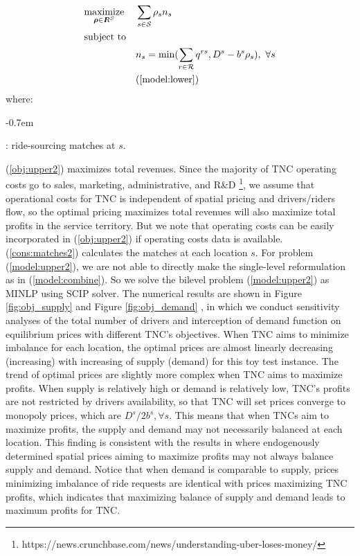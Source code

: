 \documentclass[review]{elsarticle}
\begin{document}
\begin{subequations}
\begin{align}
& \underset{\boldsymbol{\rho} \in {I\kern-.35em R}^{S}}{\text{maximize}}
& &\sum_{s \in \mathcal{S}} \rho_s n_s \label{obj:upper2}\\
& \text{subject to}  & & \nonumber \\
& && n_s = \min(\sum_{r \in \mathcal{R}} q^{rs}, {D}^s - b^s\rho_s), \ \forall s \label{cons:matches2}\\
& && (\ref{model:lower})
\end{align}
\label{model:upper2}
\end{subequations}
where: 
\begin{description}[leftmargin=!,labelwidth=\widthof{12345}]
\itemsep-0.7em
\item[$n_{s}$] : ride-sourcing matches at $s$.
\end{description}

(\ref{obj:upper2}) maximizes total revenues. Since the majority of TNC operating costs go to sales, marketing, administrative, and R\&D \footnote{https://news.crunchbase.com/news/understanding-uber-loses-money/}, we assume that operational costs for TNC is independent of spatial pricing and drivers/riders flow, so the optimal pricing maximizes total revenues will also maximize total profits in the service territory. But we note that operating costs can be easily incorporated in (\ref{obj:upper2}) if operating costs data is available. (\ref{cons:matches2}) calculates the matches at each location $s$. For problem (\ref{model:upper2}), we are not able to directly make the single-level reformulation as in (\ref{model:combine}). So we solve the bilevel problem (\ref{model:upper2}) as MINLP using SCIP solver. The numerical results are shown in Figure \ref{fig:obj_supply} and Figure \ref{fig:obj_demand} , in which we conduct sensitivity analyses of the total number of drivers and interception of demand function on equilibrium prices with different TNC's objectives. When TNC aims to minimize imbalance for each location, the optimal prices are almost linearly decreasing (increasing) with increasing of supply (demand) for this toy test instance. The trend of optimal prices are slightly more complex when TNC aims to maximize profits. When supply is relatively high or demand is relatively low, TNC's profits are not restricted by drivers availability, so that TNC will set prices converge to monopoly prices, which are $D^s/2b^s, \forall s$. This means that when TNCs aim to maximize profits, the supply and demand may not necessarily balanced at each location. This finding is consistent with the results in \citep{bimpikis2019spatial} where endogenously determined spatial prices aiming to maximize profits may not always balance supply and demand. Notice that when demand is comparable to supply, prices minimizing imbalance of ride requests are identical with prices maximizing TNC profits, which indicates that maximizing balance of supply and demand leads to maximum profits for TNC.
\end{document}
